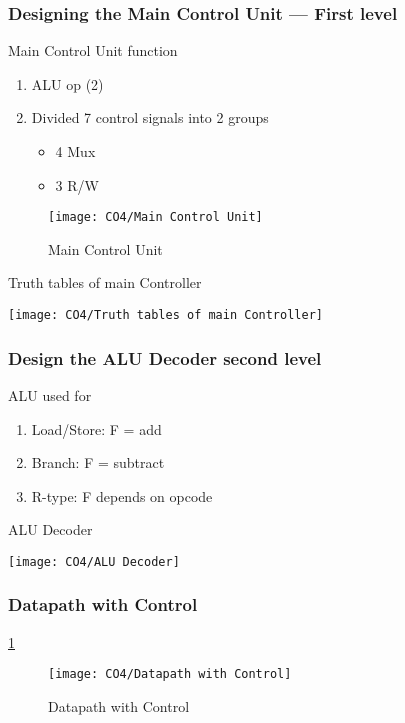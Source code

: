 \subsubsection{Designing the Main Control Unit --- First level}

Main Control Unit function
\begin{enumerate}
    \item ALU op (2)
    \item Divided 7 control signals into 2 groups
    \begin{itemize}
        \item\small 4 Mux
        \item\small 3 R/W
    \end{itemize}
\end{enumerate}

\begin{figure}[!htb]
    \centering
    \texttt{[image: CO4/Main Control Unit]}
    \caption{Main Control Unit}
\end{figure}

\begin{table}[!htb]
    \centering
    \caption{Truth tables of main Controller}
    \texttt{[image: CO4/Truth tables of main Controller]}
\end{table}

\subsubsection{Design the ALU Decoder second level}
ALU used for
\begin{enumerate}
    \item\small Load/Store: F = add
    \item\small Branch: F = subtract
    \item\small R-type: F depends on opcode
\end{enumerate}

\begin{table}[!htb]
    \centering
    \caption{ALU Decoder}
    \texttt{[image: CO4/ALU Decoder]}
\end{table}


\subsubsection{Datapath with Control}
\ref{Datapath with Control}
\begin{figure}[!htb]
    \centering
    \texttt{[image: CO4/Datapath with Control]}
    \caption{Datapath with Control}
    \label{Datapath with Control}
\end{figure}

